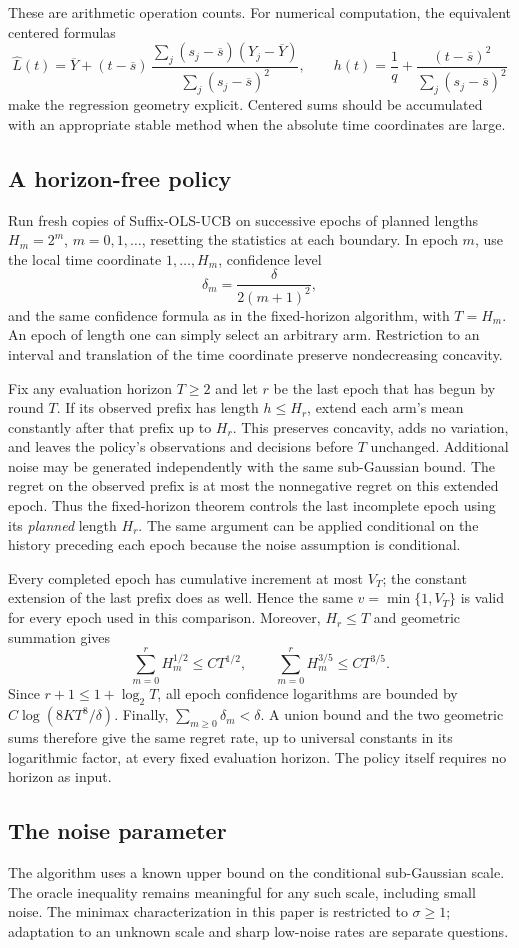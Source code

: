 \documentclass[11pt]{article}
\theoremstyle{remark}
\begin{document}
These are arithmetic operation counts.  For numerical computation,
the equivalent centered formulas
\[
\widehat L(t)=\overline Y+
(t-\overline s)\,
\frac{\sum_j(s_j-\overline s)(Y_j-\overline Y)}
     {\sum_j(s_j-\overline s)^2},
\qquad
h(t)=\frac1q+
\frac{(t-\overline s)^2}{\sum_j(s_j-\overline s)^2}
\]
make the regression geometry explicit.  Centered sums should be
accumulated with an appropriate stable method when the absolute time
coordinates are large.

\subsection{A horizon-free policy}

Run fresh copies of Suffix-OLS-UCB on successive epochs of planned
lengths $H_m=2^m$, $m=0,1,\ldots$, resetting the statistics at each
boundary.  In epoch $m$, use the local time coordinate
$1,\ldots,H_m$, confidence level
\[
\delta_m=\frac{\delta}{2(m+1)^2},
\]
and the same confidence formula as in the fixed-horizon algorithm,
with $T=H_m$.  An epoch of length one can simply select an arbitrary
arm.  Restriction to an interval and translation of the time
coordinate preserve nondecreasing concavity.

Fix any evaluation horizon $T\ge2$ and let $r$ be the last epoch that
has begun by round $T$.  If its observed prefix has length $h\le H_r$,
extend each arm's mean constantly after that prefix up to $H_r$.
This preserves concavity, adds no variation, and leaves the policy's
observations and decisions before $T$ unchanged.  Additional noise may
be generated independently with the same sub-Gaussian bound.  The
regret on the observed prefix is at most the nonnegative regret on
this extended epoch.  Thus the fixed-horizon theorem controls the
last incomplete epoch using its \emph{planned} length $H_r$.
The same argument can be applied conditional on the history preceding
each epoch because the noise assumption is conditional.

Every completed epoch has cumulative increment at most $V_T$; the
constant extension of the last prefix does as well.  Hence the same
$v=\min\{1,V_T\}$ is valid for every epoch used in this comparison.
Moreover, $H_r\le T$ and geometric summation gives
\[
\sum_{m=0}^r H_m^{1/2}\le C T^{1/2},
\qquad
\sum_{m=0}^r H_m^{3/5}\le C T^{3/5}.
\]
Since $r+1\le1+\log_2T$, all epoch confidence logarithms are bounded by
$C\log(8KT^8/\delta)$.  Finally,
$\sum_{m\ge0}\delta_m<\delta$.  A union bound and the two geometric
sums therefore give the same regret rate, up to universal constants
in its logarithmic factor, at every fixed evaluation horizon.
The policy itself requires no horizon as input.

\subsection{The noise parameter}

The algorithm uses a known upper bound on the conditional sub-Gaussian
scale.  The oracle inequality remains meaningful for any such scale,
including small noise.  The minimax characterization in this paper is
restricted to $\sigma\ge1$; adaptation to an unknown scale and sharp
low-noise rates are separate questions.
\end{document}

